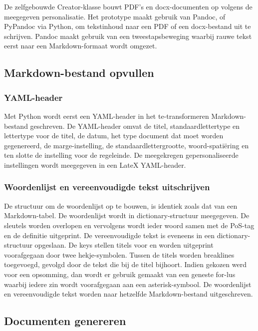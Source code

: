 De zelfgebouwde Creator-klasse bouwt PDF's en docx-documenten op volgens de meegegeven personalisatie. Het prototype maakt gebruik van Pandoc, of PyPandoc via Python, om tekstinhoud naar een PDF of een docx-bestand uit te schrijven. Pandoc maakt gebruik van een tweestapsbeweging waarbij rauwe tekst eerst naar een Markdown-formaat wordt omgezet.

\subsection{Markdown-bestand opvullen}

\subsubsection{YAML-header}

Met Python wordt eerst een YAML-header in het te-transformeren Markdown-bestand geschreven. De YAML-header omvat de titel, standaardlettertype en lettertype voor de titel, de datum, het type document dat moet worden gegenereerd, de marge-instelling, de standaardlettergrootte, woord-spatiëring en ten slotte de instelling voor de regeleinde. De meegekregen gepersonaliseerde instellingen wordt meegegeven in een LateX YAML-header. 

\subsubsection{Woordenlijst en vereenvoudigde tekst uitschrijven}

De structuur om de woordenlijst op te bouwen, is identiek zoals dat van een Markdown-tabel. De  woordenlijst wordt in dictionary-structuur meegegeven. De sleutels worden overlopen en vervolgens wordt ieder woord samen met de PoS-tag en de definitie uitgeprint. De vereenvoudigde tekst is eveneens in een dictionary-structuur opgeslaan. De keys stellen titels voor en worden uitgeprint voorafgegaan door twee hekje-symbolen. Tussen de titels worden breaklines toegevoegd, gevolgd door de tekst die bij de titel bijhoort. Indien gekozen werd voor een opsomming, dan wordt er gebruik gemaakt van een geneste for-lus waarbij iedere zin wordt voorafgegaan aan een asterisk-symbool. De woordenlijst en vereenvoudigde tekst worden naar hetzelfde Markdown-bestand uitgeschreven. 

\subsection{Documenten genereren}


